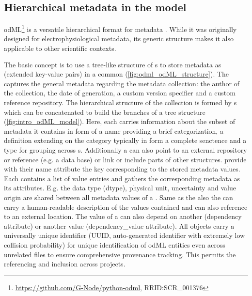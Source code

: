 \subsection{Hierarchical metadata in the  model}
\label{sec:subodML}

odML\footnote{\url{https://github.com/G-Node/python-odml}, RRID:SCR\_001376} is a versatile hierarchical format for metadata \citep{Grewe_2011}. While it was originally designed for electrophysiological metadata, its generic structure makes it also applicable to other scientific contexts.

The basic concept is to use a tree-like structure of s to store metadata as  (extended key-value pairs) in a common  (\cref{fig:odml_odML_structure}). The  captures the general metadata regarding the metadata collection: the author of the collection, the date of generation, a custom version specifier and a custom reference repository. The hierarchical structure of the collection is formed by s which can be concatenated to build the branches of a tree structure (\cref{fig:intro_odML_model}). Here, each  carries information about the subset of metadata it contains in form of a  name providing a brief categorization, a definition extending on the category typically in form a complete senctence and a type for grouping across s. Additionally a  can also point to an external repository or reference (e.g. a data base) or link or include parts of other  structures.  provide with their name attribute the key corresponding to the stored metadata values. Each  contains a list of value entries and gathers the corresponding metadata as its  attributes. E.g. the data type (dtype), physical unit, uncertainty and value origin are shared between all metadata values of a . Same as the  also the  can carry a human-readable description of the values contained and can also reference to an external location. The value of a  can also depend on another  (dependency attribute) or another  value (dependency\_value attribute). All  objects carry a universally unique identifier (UUID, auto-generated identifier with extremely low collision probability) for unique identification of odML entities even across unrelated files to ensure comprehensive provenance tracking. This permits the referencing and inclusion across projects.


